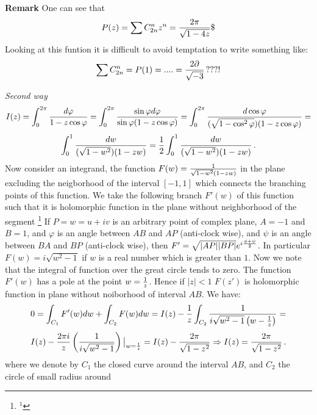 \m

{\bf Remark} One can see that 
   $$P(z)=\sum C^n_{2n}z^{n}
                ={2\pi\over \sqrt {1-4z}}\$
         $$
Looking at this funtion it is 
difficult to avoid temptation to write something like:
           $$
\sum C^n_{2n}=P(1)=....={2\partial\over \sqrt{-3}}\, ???!
           $$

{\it Second way}
                  $$
I(z)=\int_0^{2\pi}{d\varphi\over 1-z\cos\varphi}=
\int_0^{2\pi}{\sin\varphi d\varphi\over \sin\varphi(1-z\cos\varphi)}=
\int_0^{2\pi}{d\cos\varphi\over (\sqrt{1-\cos^2\varphi})(1-z\cos\varphi)}=
                     $$
                     $$
\int_0^1{dw\over (\sqrt{1-w^2})(1-zw)}=
{1\over2}\int_0^1{dw\over (\sqrt{1-w^2})(1-zw)}\,.
                     $$
Now consider an integrand, the  function 
$F(w)={1\over {\sqrt {1-w^2}}(1-zw)}$
in the plane excluding the neigborhood of the interval
$[-1,1]$ which connects the branching points of this function.
   We take the following branch $F'(w)$ of this function
such that it is holomorphic
 function in the plane without neighborhood of the segment
\footnote{$^{1}$}
{If $P=w=u+iv$ is an arbitrary point of complex plane,
  $A=-1$ and $B=1$,
 and $\varphi$ is an angle between $AB$ and $AP$ (anti-clock wise),
 and $\psi$ is an angle between $BA$ and $BP$ (anti-clock wise),
  then  $F'=\sqrt {|AP||BP|}e^{i{\phi+\psi\over 2}}$.
  In particular $F(w)=i{\sqrt{w^2-1}}$ if $w$ is  a real number which is greater
than $1$.}
Now we note that the integral of function over the great circle tends to zero.
   The function $F'(w)$ has a pole at the point $w={1\over z}$.
  Hence if $|z|<1$ $F(z')$ is holomorphic function in plane without
 noiborhood of interval $AB$. We have:
                      $$
  0= \int_{C_1} F'(w)dw+\int_{C_2}F(w)dw=I(z)-
         {1\over z}\int_{C_2}{1\over i\sqrt{w^2-1}\left(w-{1\over z}\right)}=
                     $$
                     $$
           I(z)-{2\pi i\over z}\left({1\over i\sqrt{w^2-1}}\right)
           \big\vert_{w={1\over z}}=I(z)-{2\pi\over \sqrt{1-z^2}}
\Rightarrow   I(z)={2\pi\over \sqrt{1-z^2}}\,.
                      $$ 
where we denote by $C_1$ the closed curve around the interval $AB$,
and $C_2$ the circle of small radius around
      


\bye


